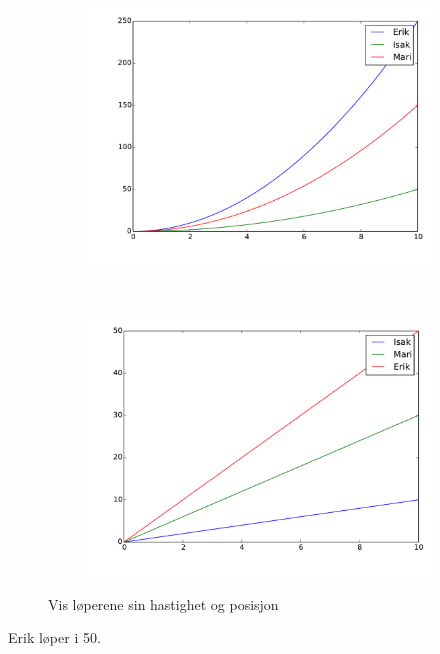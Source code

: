 \begin{figure}[H]
    \centering
    \begin{subfigure}{0.5\textwidth}
        \centering
        \includegraphics[width=\linewidth]{bilder/standard1.pdf}
        \caption{}
    \end{subfigure}%
    ~
    \begin{subfigure}{0.5\textwidth}
        \centering
        \includegraphics[width=\linewidth]{bilder/standard2.pdf}
        \caption{}
    \end{subfigure}
    \caption{Vis løperene sin hastighet og posisjon}
    \label{fig:standard}
\end{figure}

Erik løper i 50.


